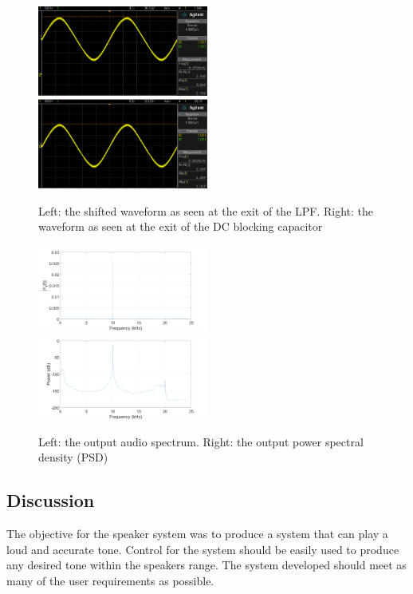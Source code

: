 \begin{figure} [!htb]
	\captionsetup{justification=centering}
	\includegraphics[width=0.5\textwidth]{./images/speaker/L_LPF_Output}
	\includegraphics[width=0.5\textwidth]{./images/speaker/L_Shifted_Waveform}
	\caption{Left: the shifted waveform as seen at the exit of the LPF. Right: the waveform as seen at the exit of the DC blocking capacitor}
	\label{fig:L_Shifted_Waveform}
\end{figure}

\begin{figure} [!htb]
	\captionsetup{justification=centering}
	\includegraphics[width=0.5\textwidth]{./images/speaker/L_Output}
	\includegraphics[width=0.5\textwidth]{./images/speaker/L_output_PSD}
	\caption{Left: the output audio spectrum. Right: the output power spectral density (PSD)}
	\label{fig:L_Output}
\end{figure}

\pagebreak
\subsection{Discussion}
The objective for the speaker system was to produce a system that can play a loud and accurate tone. Control for the system should be easily used to produce any desired tone within the speakers range. The system developed should meet as many of the user requirements as possible. \\

